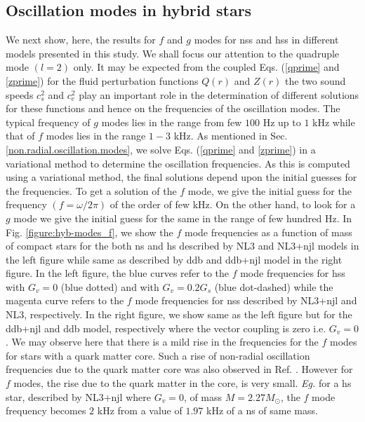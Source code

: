 \documentclass[a4paper, 11pt]{article}
\begin{document}
\subsection{Oscillation modes in hybrid stars} \label{oscillation.modes.in.hybrid.stars}
We next show, here, the results for $f$ and $g$ modes for \ac{ns}s and \ac{hs}s in different models presented in this study. We shall focus our attention to the quadruple mode $(l=2)$ only. It may be expected from the coupled Eqs. (\ref{qprime} and \ref{zprime}) for the fluid perturbation functions $Q(r)$ and $Z(r)$ the two sound speeds $c_s^2$ and $c_e^2$ play an important role in the determination of different solutions for these functions and hence on the frequencies of the oscillation modes. The typical frequency of $g$ modes lies in the range from few $100$ Hz up to $1$ kHz while that of $f$ modes lies in the range $1-3$ kHz. As mentioned in Sec. \ref{non.radial.oscillation.modes}, we solve Eqs. (\ref{qprime} and \ref{zprime}) in a variational method to determine the oscillation frequencies. As this is computed using a variational method, the final solutions depend upon the initial guesses for the frequencies. To get a solution of the $f$ mode, we give the initial guess for the frequency $(f=\omega/2\pi)$ of the order of few kHz. On the other hand, to look for a $g$ mode we give the initial guess for the same in the range of few hundred Hz. In Fig. \ref{figure:hyb-modes_f}, we show the $f$ mode frequencies as a function of mass of compact stars for the both \ac{ns} and \ac{hs} described by NL3 and NL3+\ac{njl} models in the left figure while same as described by \ac{ddb} and \ac{ddb}+\ac{njl} model in the right figure. In the left figure, the blue curves refer to the $f$ mode frequencies for \ac{hs}s with $G_v=0$ (blue dotted) and with $G_v=0.2 G_s$ (blue dot-dashed) while the magenta curve refers to the $f$ mode frequencies for \ac{ns}s described by NL3+\ac{njl} and NL3, respectively. In the right figure, we show same as the left figure but for the \ac{ddb}+\ac{njl} and \ac{ddb} model, respectively where the vector coupling is zero i.e. $G_v=0$. We may observe here that there is a mild rise in the frequencies for the $f$ modes for stars with a quark matter core. Such a rise of non-radial oscillation frequencies due to the quark matter core was also observed in Ref. \cite{Wei:2018, Jaikumar:2021jbw}. However for $f$ modes, the rise due to the quark matter in the core, is very small. {\it Eg.} for a \ac{hs} star, described by NL3+\ac{njl} where $G_v=0$, of mass $M=2.27 M_{\odot}$, the $f$ mode frequency becomes $2$ kHz from a value of $1.97$ kHz of a \ac{ns} of same mass.
\end{document}

